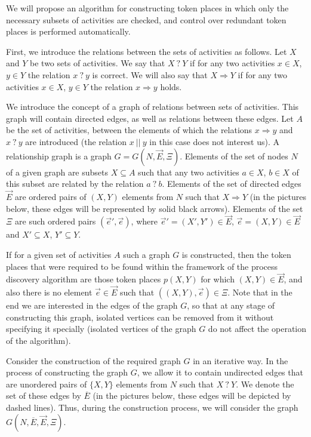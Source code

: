 \documentclass[
11pt,%
tightenlines,%
twoside,%
onecolumn,%
nofloats,%
nobibnotes,%
nofootinbib,%
superscriptaddress,%
noshowpacs,%
centertags]%
{revtex4}
\begin{document}
We will propose an algorithm for constructing token places in which only the necessary subsets of activities are checked, and control over redundant token places is performed automatically.

First, we introduce the relations between the sets of activities as follows.
Let $X$ and $Y$ be two sets of activities.
We say that $X \ ? \ Y$ if for any two activities $x \in X$, $y \in Y$ the relation $x \ ? \ y$ is correct.
We will also say that $X \Rightarrow Y$ if for any two activities $x \in X$, $y \in Y$ the relation $x \Rightarrow y$ holds.

We introduce the concept of a graph of relations between sets of activities.
This graph will contain directed edges, as well as relations between these edges.
Let $A$ be the set of activities, between the elements of which the relations $x \Rightarrow y$ and $x \ ? \ y$ are introduced (the relation $x \ || \ y$ in this case does not interest us).
A relationship graph is a graph $G = G(N, \overrightarrow{E}, \Xi)$.
Elements of the set of nodes $N$ of a given graph are subsets $X \subseteq A$ such that any two activities $a \in X$, $b \in X$ of this subset are related by the relation $a \ ? \ b$.
Elements of the set of directed edges $\overrightarrow {E}$ are ordered pairs of $(X, Y)$ elements from $N$ such that $X \Rightarrow Y$ (in the pictures below, these edges will be represented by solid black arrows).
Elements of the set $\Xi$ are such ordered pairs $(\overrightarrow{e}', \overrightarrow{e})$, where $\overrightarrow {e}' = (X ', Y') \in \overrightarrow{E}$, $\overrightarrow{e} = (X, Y) \in \overrightarrow{E}$ and $X' \subseteq X$, $Y' \subseteq Y$.    

If for a given set of activities $A$ such a graph $G$ is constructed, then the token places that were required to be found within the framework of the process discovery algorithm are those token places $p(X, Y)$ for which $(X, Y) \in \overrightarrow {E}$, and also there is no element $\overrightarrow{e} \in \overrightarrow {E}$ such that $((X, Y), \overrightarrow {e}) \in \Xi $.
Note that in the end we are interested in the edges of the graph $G$, so that at any stage of constructing this graph, isolated vertices can be removed from it without specifying it specially (isolated vertices of the graph $G$ do not affect the operation of the algorithm).

Consider the construction of the required graph $G$ in an iterative way.
In the process of constructing the graph $G$, we allow it to contain undirected edges that are unordered pairs of $\{X, Y\}$ elements from $N$ such that $X \ ? \ Y$.
We denote the set of these edges by $\overline{E}$ (in the pictures below, these edges will be depicted by dashed lines).
Thus, during the construction process, we will consider the graph $G(N, \overline{E}, \overrightarrow{E}, \Xi)$.
\end{document}
